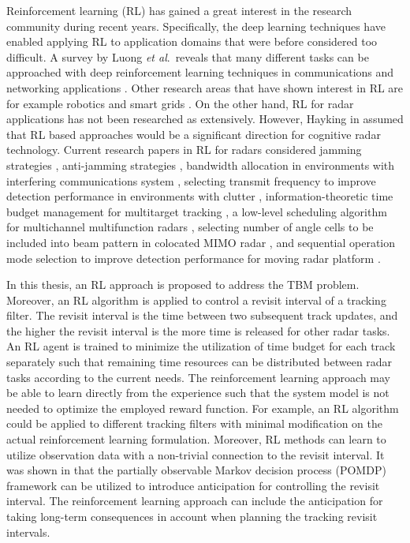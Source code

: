 \documentclass[english, 12pt, a4paper, elec, utf8, a-1b, online]{aaltothesis}
\newcommand{\etal}{\textit{et al}.~}
\begin{document}
Reinforcement learning (RL) has gained a great interest in the research community during recent years.
Specifically, the deep learning techniques have enabled applying RL to application domains that were before considered too difficult.
A survey by Luong \etal reveals that many different tasks can be approached with deep reinforcement learning techniques in communications and networking applications \cite{Luong2018}.
Other research areas that have shown interest in RL are for example robotics \cite{Kober2013} and smart grids \cite{Zhang2018}.
On the other hand, 
RL for radar applications has not been researched as extensively.
However, Hayking in \cite{Haykin2006} assumed that RL based approaches would be a significant direction for cognitive radar technology.
Current research papers in RL for radars considered 
jamming strategies \cite{Qiang2017, Wang2019, Wang2019a, Zhang2019},
anti-jamming strategies \cite{Kang2018, Ak2019}, 
bandwidth allocation in environments with interfering communications system \cite{Selvi2018, Kozy2019},
selecting transmit frequency to improve detection performance in environments with clutter \cite{Wabeke2010}, 
information-theoretic time budget management for multitarget tracking \cite{Kreucher2005, Xu2010},
a low-level scheduling algorithm for multichannel multifunction radars \cite{Shaghaghi2018},
selecting number of angle cells to be included into beam pattern in colocated MIMO radar \cite{Wang2018}, 
and sequential operation mode selection to improve detection performance for moving radar platform \cite{Smits2008}.

In this thesis, an RL approach is proposed to address the TBM problem.
Moreover, an RL algorithm is applied to control a revisit interval of a tracking filter. 
The revisit interval is the time between two subsequent track updates, and the higher the revisit interval is the more time is released for other radar tasks.
An RL agent is trained to minimize the utilization of time budget for each track separately such that remaining time resources can be distributed between radar tasks according to the current needs.
The reinforcement learning approach may be able to learn directly from the experience such that the system model is not needed to optimize the employed reward function.
For example, an RL algorithm could be applied to different tracking filters with minimal modification on the actual reinforcement learning formulation.  
Moreover, RL methods can learn to utilize observation data with a non-trivial connection to the revisit interval.
It was shown in \cite{Charlish2015} that the partially observable Markov decision process (POMDP) framework can be utilized to introduce anticipation for controlling the revisit interval.
The reinforcement learning approach can include the anticipation for taking long-term consequences in account when planning the 
tracking revisit intervals.
\end{document}
